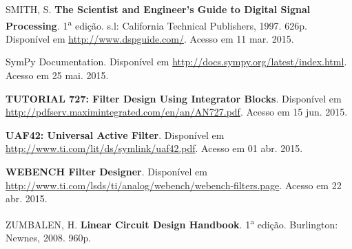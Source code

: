 \begin{thebibliography}{99}
 SMITH, S. \textbf{The Scientist and Engineer's Guide to Digital Signal Processing}. 1\textsuperscript{a}  edição. s.l: California Technical Publishers, 1997. 626p. Disponível em \url{http://www.dspguide.com/}. Acesso em 11 mar. 2015.

 SymPy Documentation. Disponível em \url{http://docs.sympy.org/latest/index.html}. Acesso em 25 mai. 2015.

 \textbf{TUTORIAL 727: Filter Design Using Integrator Blocks}. Disponível em \url{http://pdfserv.maximintegrated.com/en/an/AN727.pdf}. Acesso em 15 jun. 2015.



 \textbf{UAF42: Universal Active Filter}. Disponível em \url{http://www.ti.com/lit/ds/symlink/uaf42.pdf}. Acesso em 01 abr. 2015.

 \textbf{WEBENCH Filter Designer}. Disponível em \url{http://www.ti.com/lsds/ti/analog/webench/webench-filters.page}. Acesso em 22 abr. 2015.

 ZUMBALEN, H. \textbf{Linear Circuit Design Handbook}. 1\textsuperscript{a} edição. Burlington: Newnes, 2008. 960p. %
\end{thebibliography}